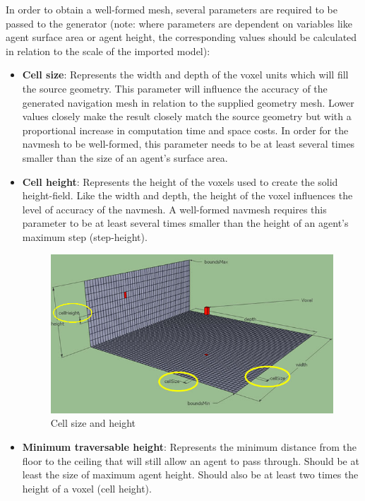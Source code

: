 \documentclass[a4paper,11pt]{article}
\begin{document}
In order to obtain a well-formed mesh, several parameters are required to be passed to the generator (note: where parameters are dependent on variables like agent surface area or agent height, the corresponding values should be calculated in relation to the scale of the imported model):
\begin{itemize}
  \item\textbf{Cell size}: Represents the width and depth of the voxel units which will fill the source geometry. This parameter will influence the accuracy of the generated navigation mesh in relation to the supplied geometry mesh. Lower values closely make the result closely match the source geometry but with a proportional increase in computation time and space costs. In order for the navmesh to be well-formed, this parameter needs to be at least several times smaller than the size of an agent's surface area.
  
  \item\textbf{Cell height}: Represents the height of the voxels used to create the solid height-field. Like the width and depth, the height of the voxel influences the level of accuracy of the navmesh. A well-formed navmesh requires this parameter to be at least several times smaller than the height of an agent's maximum step (step-height).
  
\begin{figure}[H]
	\centering
	\includegraphics[width=1\textwidth]{cell_size_height.png}
	\caption{Cell size and height}
\end{figure}   

  
  \item\textbf{Minimum traversable height}: Represents the minimum distance from the floor to the ceiling that will still allow an agent to pass through. Should be at least the size of maximum agent height. Should also be at least two times the height of a voxel (cell height).
  

\end{itemize}
\end{document}
